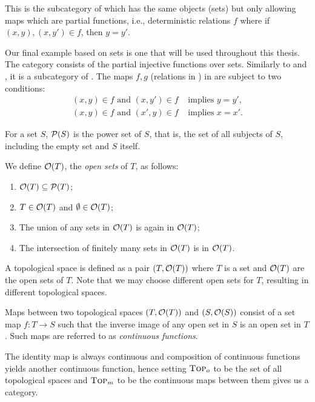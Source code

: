 \begin{example}[\Par]\label{ex:category_par}
This is the subcategory of \rel which has the same  objects (sets) but only allowing maps which are
partial functions, i.e., deterministic relations $f$ where if $(x,y), (x,y') \in f$, then $y = y'$.
\end{example}


\begin{example}[\pinj]\label{ex:category_pinj}
Our final example based on sets is one that will be used throughout this thesis. The category \pinj consists of
the partial injective functions over sets. Similarly to \sets and \Par, it is a subcategory
of \rel. The maps $f,g$ (relations in \rel) in \pinj are subject to two conditions:
\begin{align}
   (x,y)\in f\text{ and }(x,y')\in f & \text{ implies } y = y',\label{eq:pinj_relation_is_a_function}\\
   (x,y)\in f\text{ and }(x',y)\in f & \text{ implies } x = x'.\label{eq:pinj_converse_relation_is_a_function}
\end{align}

\end{example}

\begin{example}[\topcat]\label{ex:category_top}
  For a set $S$, $\mathcal{P}({S})$ is the power set of $S$, that is, the set of all subjects of $S$,
  including the empty set and $S$ itself.

  We define $\mathcal{O}({T})$, the \emph{open sets} of $T$, as follows:
  \begin{enumerate}[{(}i{)}]
    \item $\mathcal{O}({T}) \subseteq \mathcal{P}({T})$;
    \item $T\in \mathcal{O}({T})$ and $\emptyset \in \mathcal{O}({T})$;
    \item The union of any sets in $\mathcal{O}({T})$ is again in $\mathcal{O}({T})$;
    \item The intersection of finitely many sets in $\mathcal{O}({T})$ is in $\mathcal{O}({T})$.
  \end{enumerate}

  A topological space is defined as a pair $(T,\mathcal{O}({T}))$ where $T$ is a set and $\mathcal{O}({T})$ are the
  open sets of $T$. Note that we may choose different open sets for $T$, resulting in different
  topological spaces.

  Maps between two topological spaces $(T,\mathcal{O}({T}))$ and $(S,\mathcal{O}({S}))$ consist of
  a set map $f:T \to S$ such that the inverse image of any open set in $S$ is an open set in
  $T$. Such maps are referred to as \emph{continuous functions}.

  The identity map is always continuous and composition of continuous functions yields another
  continuous function, hence setting $\textsc{Top}_o$ to be the set of all topological spaces and
  $\textsc{Top}_m$ to be the continuous maps between them gives us a category.
\end{example}

